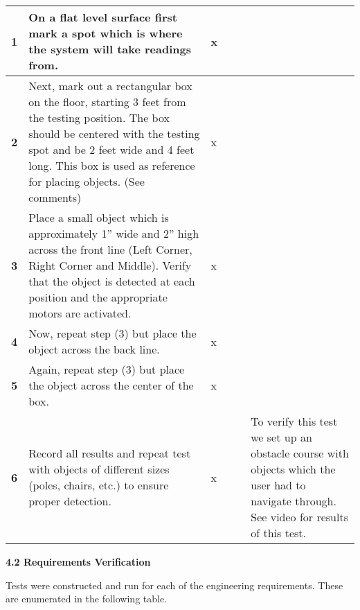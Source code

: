 \begin{table}[h]
\begin{tabular}{|p{1cm}|p{6cm}|p{0.5cm}|p{0.5cm}|p{0.5cm}|p{3cm}|}
\textbf{1} & On a flat level surface first mark a spot which is where
the system will take readings from. 
& x & & & \\ \hline

\textbf{2} & Next, mark out a rectangular box on the floor, starting 3
feet from the testing position. The box should be centered with the
testing spot and be 2 feet wide and 4 feet long. This box is used as
reference for placing objects. (See comments) 
& x & & & \\ \hline

\textbf{3} & Place a small object which is approximately 1'' wide and
2'' high across the front line (Left Corner, Right Corner and Middle).
Verify that the object is detected at each position and the appropriate
motors are activated. 
& x & & & \\ \hline

\textbf{4} & Now, repeat step (3) but place the object across the back line. 
& x & & & \\ \hline

\textbf{5} & Again, repeat step (3) but place the object across the center of the box. 
& x & & & \\ \hline

\textbf{6} & Record all results and repeat test with objects of different sizes (poles, chairs, etc.) to ensure proper detection. 
& x & & & 
To verify this test we 
set up an obstacle course 
with objects which the 
user had to navigate 
through. See video for 
results of this test. \\ \hline
\end{tabular}
\end{table}

\textbf{4.2 Requirements Verification}

Tests were constructed and run for each of the engineering requirements.
These are enumerated in the following table.


